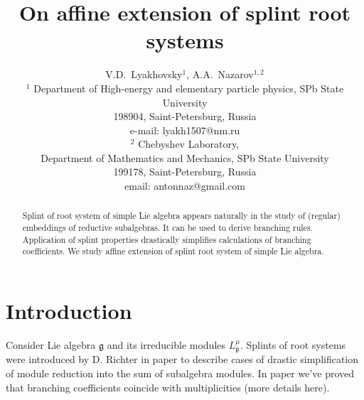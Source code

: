 \documentclass[12pt]{article}
\newcommand{\gf}{\mathfrak{g}}
\begin{document}
\title{On affine extension of splint root systems}



\author{V.D.~Lyakhovsky$^1$, A.A.~Nazarov$^{1,2}$ \\
  {\small $^1$ Department of High-energy and elementary particle physics, SPb State University}\\
  {\small 198904, Saint-Petersburg, Russia}\\
  {\small e-mail: lyakh1507@nm.ru}\\
  {\small$^{2}$ Chebyshev Laboratory,}\\
  {\small Department of Mathematics and Mechanics, SPb State University}\\
  {\small 199178, Saint-Petersburg, Russia}\\
  {\small email: antonnaz@gmail.com}}
\maketitle

\begin{abstract}
Splint of root system of simple Lie algebra appears naturally in
the study of (regular) embeddings of reductive subalgebras. It can
be used to derive branching rules. Application of
splint properties drastically simplifies calculations of
branching coefficients. We study affine extension of splint root system of simple Lie algebra.
\end{abstract}

\section{Introduction}
\label{sec:introduction}

Consider Lie algebra $\gf$ and its irreducible modules $L^{\mu}_{\gf}$. 
Splints of root systems were introduced by D. Richter in paper \cite{richter2008splints} to describe cases of drastic simplification of module reduction into the sum of subalgebra modules. In paper \cite{2011arXiv1111.6787L} we've proved that branching coefficients coincide with multiplicities (more details here). 
\end{document}
